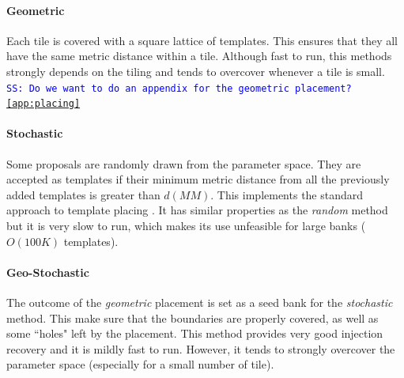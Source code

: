 \documentclass[twocolumn,showpacs,preprintnumbers,nofootinbib,prd,
superscriptaddress,10pt]{revtex4-1}
\newcommand{\stefano}[1]{{\textcolor{blue}{\texttt{SS: #1}} }}
\begin{document}
\paragraph{Geometric}\label{par:geometric}
Each tile is covered with a square lattice of templates. This ensures that they all have the same metric distance within a tile.
Although fast to run, this methods strongly depends on the tiling and tends to overcover whenever a tile is small.
\stefano{Do we want to do an appendix for the geometric placement? \ref{app:placing}}
\paragraph{Stochastic}\label{par:stochastic}
Some proposals are randomly drawn from the parameter space. They are accepted as templates if their minimum metric distance from all the previously added templates is greater than  $d(MM)$.
This implements the standard approach to template placing \cite{}. It has similar properties as the {\it random} method but it is very slow to run, which makes its use unfeasible for large banks ($O(100K)$ templates).
\paragraph{Geo-Stochastic}\label{par:geostochastic}
The outcome of the {\it geometric} placement is set as a seed bank for the {\it stochastic} method. This make sure that the boundaries are properly covered, as well as some ``holes" left by the placement. This method provides very good injection recovery and it is mildly fast to run. However, it tends to strongly overcover the parameter space (especially for a small number of tile).
\end{document}
